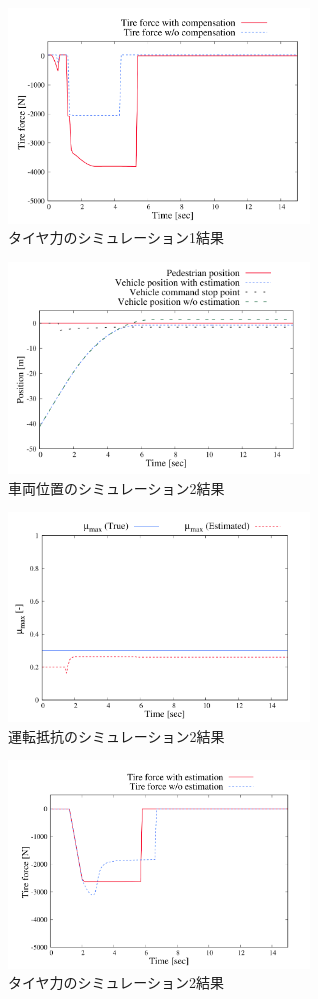 \begin{figure}[H]
    \centering
    \includegraphics[width=8cm]{./fig/fig10.png}
    \caption{タイヤ力のシミュレーション1結果}
\end{figure}
\newpage
\begin{figure}[H]
    \centering
    \includegraphics[width=8cm]{./fig/fig11.png}
    \caption{車両位置のシミュレーション2結果}
\end{figure}

\begin{figure}[H]
    \centering
    \includegraphics[width=8cm]{./fig/fig12.png}
    \caption{運転抵抗のシミュレーション2結果}
\end{figure}

\begin{figure}[H]
    \centering
    \includegraphics[width=8cm]{./fig/fig13.png}
    \caption{タイヤ力のシミュレーション2結果}
\end{figure}
